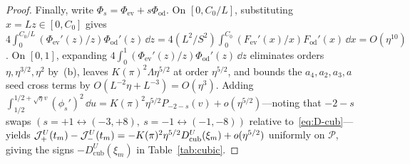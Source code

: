 \begin{proof}
Finally, write $\Phi_s=\Phi_{\mathrm{ev}}+s\Phi_{\mathrm{od}}$. On $[0,C_0/L]$, substituting $x=Lz\in[0,C_0]$ gives $4\int_0^{C_0/L}(\Phi_{\mathrm{ev}}'(z)/z)\Phi_{\mathrm{od}}'(z)\,\dd z = 4(L^2/S^2)\int_0^{C_0}(F_{\mathrm{ev}}'(x)/x)F_{\mathrm{od}}'(x)\,\dd x = O(\eta^{10})$. On $[0,1]$, expanding $4\int_0^1(\Phi_{\mathrm{ev}}'(z)/z)\Phi_{\mathrm{od}}'(z)\,\dd z$ eliminates orders $\eta,\eta^{3/2},\eta^2$ by~(b), leaves $K(\pi)^2\Lambda\eta^{5/2}$ at order $\eta^{5/2}$, and bounds the $a_4,a_2,a_3,a$ seed cross terms by $O(L^{-2}\eta+L^{-3})=O(\eta^3)$. Adding $\int_{1/2}^{1/2+\sqrt\eta v}(\phi_s')^2\,\dd u=K(\pi)^2\eta^{5/2}P_{-2-s}(v)+o(\eta^{5/2})$—noting that $-2-s$ swaps $(s=+1\leftrightarrow(-3,+8),\ s=-1\leftrightarrow(-1,-8))$ relative to~\eqref{eq:D-cub}—yields $\mathcal{J}_+^U(t_m)-\mathcal{J}_-^U(t_m)=-K(\pi)^2\eta^{5/2}D_{\mathrm{cub}}^U(\xi_m)+o(\eta^{5/2})$ uniformly on $\mathcal{P}$, giving the signs $-D_{\mathrm{cub}}^U(\xi_m)$ in Table~\ref{tab:cubic}.
\end{proof}

